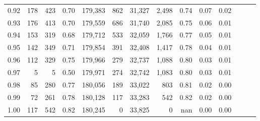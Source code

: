 \begin{tabular}{rrrrrrrrrrrrrr}
0.92 &    178 &  423 &  0.70 &  179,383 &      862 &  31,327 &   2,498 &  0.74 &  0.07 &      0.02 \\
0.93 &    176 &  413 &  0.70 &  179,559 &      686 &  31,740 &   2,085 &  0.75 &  0.06 &      0.01 \\
0.94 &    153 &  319 &  0.68 &  179,712 &      533 &  32,059 &   1,766 &  0.77 &  0.05 &      0.01 \\
0.95 &    142 &  349 &  0.71 &  179,854 &      391 &  32,408 &   1,417 &  0.78 &  0.04 &      0.01 \\
0.96 &    112 &  329 &  0.75 &  179,966 &      279 &  32,737 &   1,088 &  0.80 &  0.03 &      0.01 \\
0.97 &      5 &    5 &  0.50 &  179,971 &      274 &  32,742 &   1,083 &  0.80 &  0.03 &      0.01 \\
0.98 &     85 &  280 &  0.77 &  180,056 &      189 &  33,022 &     803 &  0.81 &  0.02 &      0.00 \\
0.99 &     72 &  261 &  0.78 &  180,128 &      117 &  33,283 &     542 &  0.82 &  0.02 &      0.00 \\
1.00 &    117 &  542 &  0.82 &  180,245 &        0 &  33,825 &       0 &   nan &  0.00 &      0.00 \\
\bottomrule
\end{tabular}
